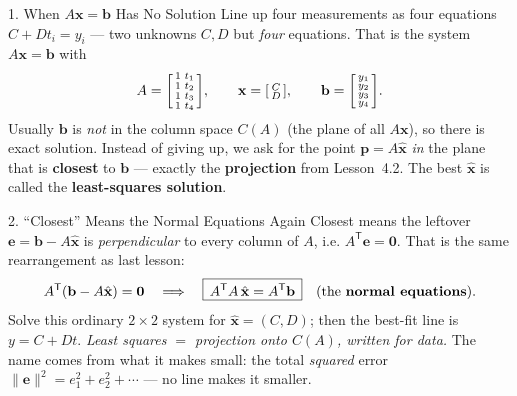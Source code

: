 \documentclass[10pt]{article}
\newcommand{\xx}{\mathbf{x}}
\newcommand{\bb}{\mathbf{b}}
\newcommand{\pp}{\mathbf{p}}
\newcommand{\ee}{\mathbf{e}}
\newcommand{\zero}{\mathbf{0}}
\newcommand{\T}{\mathsf{T}}
\begin{document}
\begin{notesbox}{1. When $A\xx=\bb$ Has No Solution}
Line up four measurements as four equations $C+Dt_i=y_i$ --- two unknowns $C,D$ but \emph{four}
equations. That is the system $A\xx=\bb$ with
\[
  A=\begin{bsmallmatrix} 1 & t_1\\ 1 & t_2\\ 1 & t_3\\ 1 & t_4 \end{bsmallmatrix},\qquad
  \xx=\begin{bsmallmatrix} C\\ D \end{bsmallmatrix},\qquad
  \bb=\begin{bsmallmatrix} y_1\\ y_2\\ y_3\\ y_4 \end{bsmallmatrix}.
\]
Usually $\bb$ is \emph{not} in the column space $C(A)$ (the plane of all $A\xx$), so there is
 exact solution. Instead of giving up, we ask for the point $\pp=A\hat{\xx}$ \emph{in} the
plane that is \textbf{closest} to $\bb$ --- exactly the \textbf{projection} from Lesson~4.2. The best
$\hat{\xx}$ is called the \textbf{least-squares solution}.
\end{notesbox}

\begin{notesbox}{2. ``Closest'' Means the Normal Equations Again}
Closest means the leftover $\ee=\bb-A\hat{\xx}$ is \emph{perpendicular} to every column of $A$, i.e.
$A^{\T}\ee=\zero$. That is the same rearrangement as last lesson:
\[
  A^{\T}(\bb-A\hat{\xx})=\zero \quad\Longrightarrow\quad
  \boxed{\,A^{\T}A\,\hat{\xx}=A^{\T}\bb\,}\quad\text{(the \textbf{normal equations}).}
\]
Solve this ordinary $2\times2$ system for $\hat{\xx}=(C,D)$; then the best-fit line is $y=C+Dt$.
\emph{Least squares $=$ projection onto $C(A)$, written for data.} The name comes from what it makes
small: the total \emph{squared} error $\|\ee\|^2=e_1^2+e_2^2+\cdots$ --- no line makes it smaller.
\end{notesbox}
\end{document}
